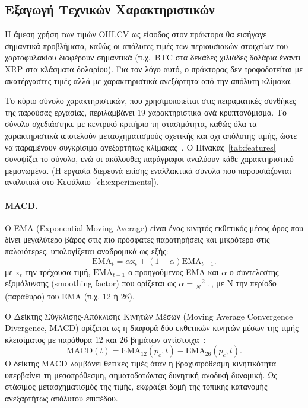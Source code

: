 \subsection{Εξαγωγή Τεχνικών Χαρακτηριστικών}
\label{sec:features}

Η άμεση χρήση των τιμών OHLCV ως είσοδος στον πράκτορα θα εισήγαγε σημαντικά 
προβλήματα, καθώς οι απόλυτες τιμές των περιουσιακών στοιχείων του χαρτοφυλακίου διαφέρουν
σημαντικά (π.χ.\ BTC στα δεκάδες χιλιάδες δολάρια έναντι XRP
στα κλάσματα δολαρίου). Για τον λόγο αυτό, ο πράκτορας δεν τροφοδοτείται με
ακατέργαστες τιμές αλλά με χαρακτηριστικά ανεξάρτητα από την απόλυτη κλίμακα.

Το κύριο σύνολο χαρακτηριστικών, που χρησιμοποιείται στις πειραματικές συνθήκες 
της παρούσας εργασίας, περιλαμβάνει $19$ χαρακτηριστικά ανά κρυπτονόμισμα. 
Το σύνολο σχεδιάστηκε με κεντρικό
κριτήριο τη στασιμότητα, καθώς όλα τα χαρακτηριστικά αποτελούν
μετασχηματισμούς σχετικής και όχι απόλυτης τιμής, ώστε να παραμένουν
συγκρίσιμα ανεξαρτήτως κλίμακας~\cite{gort2022finrlcrypto}. Ο
Πίνακας~\ref{tab:features} συνοψίζει το σύνολο, ενώ οι ακόλουθες παράγραφοι
αναλύουν κάθε χαρακτηριστικό μεμονωμένα. (Η εργασία διερευνά επίσης
εναλλακτικά σύνολα που παρουσιάζονται αναλυτικά στο Κεφάλαιο~\ref{ch:experiments}).

\paragraph{MACD.}
Ο EMA (Exponential Moving Average) είναι ένας κινητός εκθετικός μέσος όρος που 
δίνει μεγαλύτερο βάρος στις πιο πρόσφατες παρατηρήσεις και μικρότερο στις 
παλαιότερες, υπολογίζεται αναδρομικά ως εξής:
\begin{equation}
  \mathrm{EMA}_{t} = \alpha\mathrm{x}_{t} + (1-\alpha)\mathrm{EMA}_{t-1}.
\end{equation}
με $\mathrm{x}_{t}$ την τρέχουσα τιμή, $\mathrm{EMA}_{t-1}$ ο προηγούμενος EMA 
και $\alpha$ ο συντελεστης εξομάλυνσης (smoothing factor) που ορίζεται ως 
$\alpha = \tfrac{2}{N+1}$, με N την περίοδο (παράθυρο) του EMA (π.χ. 12 ή 26).

Ο Δείκτης Σύγκλισης-Απόκλισης Κινητών Μέσων (Moving Average Convergence
Divergence, MACD) ορίζεται ως η διαφορά δύο εκθετικών κινητών μέσων της τιμής
κλεισίματος με παράθυρα $12$ και $26$ βημάτων αντίστοιχα~\cite{murphy1999technical}:
\begin{equation}
  \mathrm{MACD}(t) = \mathrm{EMA}_{12}(p_c, t) - \mathrm{EMA}_{26}(p_c, t).
  \label{eq:macd}
\end{equation}
Ο δείκτης MACD λαμβάνει θετικές τιμές όταν η βραχυπρόθεσμη κινητικότητα υπερβαίνει
τη μεσοπρόθεσμη, σηματοδοτώντας δυνητική ανοδική δυναμική. Ως στάσιμος
μετασχηματισμός της τιμής, εκφράζει δομή της τοπικής κατανομής ανεξαρτήτως
απόλυτου επιπέδου.

